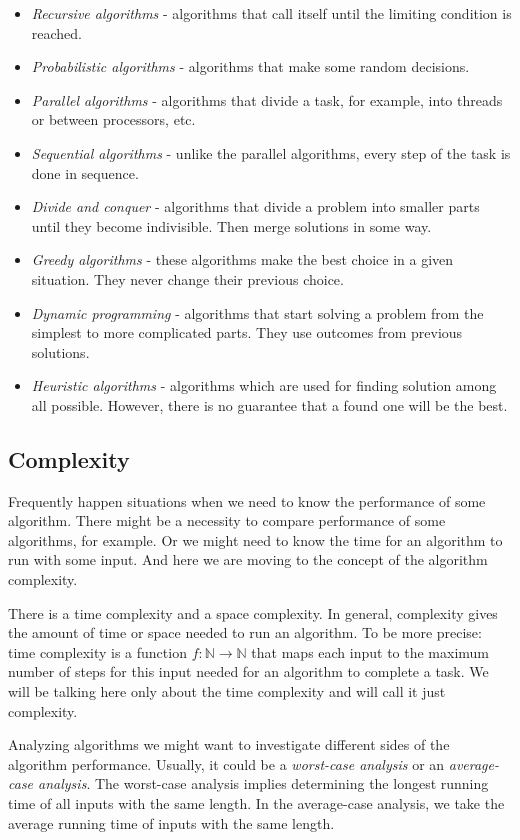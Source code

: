 \documentclass[
  field=inf,
  biblatex,
  language=english,
  glossaries,
  theorems=false,
  sourcecodes=false,
  index
]{kidiplom}
\begin{document}
\begin{itemize}
	\item \textit{Recursive algorithms} - algorithms that call itself until the limiting condition is reached.
	\item \textit{Probabilistic algorithms} - algorithms that make some random decisions.
	\item \textit{Parallel algorithms} - algorithms that divide a task, for example, into threads or between processors, etc.
	\item \textit{Sequential algorithms} - unlike the parallel algorithms, every step of the task is done in sequence.
	\item \textit{Divide and conquer} - algorithms that divide a problem into smaller parts until they become indivisible. Then merge solutions in some way.
	\item \textit{Greedy algorithms} - these algorithms make the best choice in a given situation. They never change their previous choice.
	\item \textit{Dynamic programming} - algorithms that start solving a problem from the simplest to more complicated parts. They use outcomes from previous solutions.
	\item \textit{Heuristic algorithms} - algorithms which are used for finding solution among all possible. However, there is no guarantee that a found one will be the best.
\end{itemize}

\subsection{Complexity}

Frequently happen situations when we need to know the performance of some algorithm. There might be a necessity to compare performance of some algorithms, for example. Or we might need to know the time for an algorithm to run with some input. And here we are moving to the concept of the algorithm complexity.

There is a time complexity and a space complexity. In general, complexity gives the amount of time or space needed to run an algorithm. To be more precise: time complexity is a function $f:\mathbb{N}\to\mathbb{N}$ that maps each input to the maximum number of steps for this input needed for an algorithm to complete a task. We will be talking here only about the time complexity and will call it just complexity.

Analyzing algorithms we might want to investigate different sides of the algorithm performance. Usually, it could be a \textit{worst-case analysis} or an \textit{average-case analysis}. The worst-case analysis implies determining the longest running time of all inputs with the same length. In the average-case analysis, we take the average running time of inputs with the same length.
\end{document}
